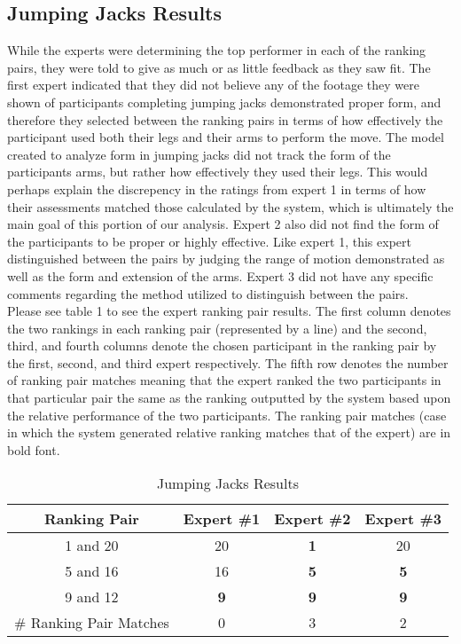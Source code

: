 \subsection{Jumping Jacks Results}
While the experts were determining the top performer in each of the ranking pairs, they were told to give as much or as little feedback as they saw fit.  The first expert indicated that they did not believe any of the footage they were shown of participants completing jumping jacks demonstrated proper form, and therefore they selected between the ranking pairs in terms of how effectively the participant used both their legs and their arms to perform the move.  The model created to analyze form in jumping jacks did not track the form of the participants arms, but rather how effectively they used their legs.  This would perhaps explain the discrepency in the ratings from expert 1 in terms of how their assessments matched those calculated by the system, which is ultimately the main goal of this portion of our analysis.  Expert 2 also did not find the form of the participants to be proper or highly effective.  Like expert 1, this expert distinguished between the pairs by judging the range of motion demonstrated as well as the form and extension of the arms. Expert 3 did not have any specific comments regarding the method utilized to distinguish between the pairs.  \\
Please see table 1 to see the expert ranking pair results.  The first column denotes the two rankings in each ranking pair (represented by a line) and the second, third, and fourth columns denote the chosen participant in the ranking pair by the first, second, and third expert respectively.  The fifth row denotes the number of ranking pair matches meaning that the expert ranked the two participants in that particular pair the same as the ranking outputted by the system based upon the relative performance of the two participants.  The ranking pair matches (case in which the system generated relative ranking matches that of the expert) are in bold font.\\

\begin{table}[h!]
\caption{Jumping Jacks Results}
\centering
\begin{tabular}{c c c c}
\hline \hline
Ranking Pair & Expert \#1 & Expert \#2 & Expert \#3 \\ [0.5ex]
\hline
1 and 20 &		20&				\textbf{1}&		20 \\
5 and 16 &		16&				\textbf{5}&		\textbf{5} \\
9 and 12 &		\textbf{9}&		\textbf{9}&		\textbf{9} \\
\hline
\# Ranking Pair Matches &		0&		3&		2 \\
\end{tabular}
\label{table:jumpingjacksresult}
\end{table}

